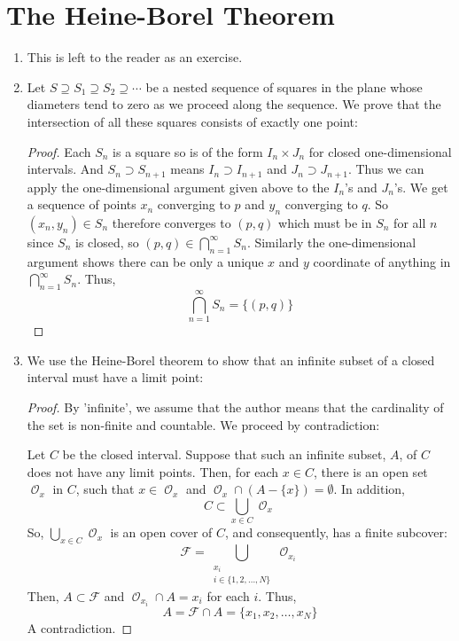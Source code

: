 \documentclass{book}
\DeclareMathOperator*{\Ocal}{\mathcal{O}}
\begin{document}
\section{The Heine-Borel Theorem}
\begin{enumerate}[(1)]
    \item This is left to the reader as an exercise.

    \item Let $S\supseteq S_1\supseteq S_2\supseteq \cdots$ be a nested sequence of squares in the plane whose diameters tend to zero as we proceed along the sequence. We prove that the intersection of all these squares consists of exactly one point: 
        \begin{proof} Each $S_n$ is a square so is of the form $I_n\times J_n$ for closed one-dimensional intervals.  And $S_n\supset S_{n+1}$ means $I_n\supset I_{n+1}$ and $J_n\supset J_{n+1}$.  Thus we can apply the one-dimensional argument given above to the $I_n$'s and $J_n$'s.  We get a sequence of points $x_n$ converging to $p$ and $y_n$ converging to $q$. So $(x_n,y_n)\in S_n$ therefore converges to $(p,q)$ which must be in $S_n$ for all $n$ since $S_n$ is closed, so $(p,q)\in\bigcap_{n=1}^\infty S_n$. Similarly the one-dimensional argument shows there can be only a unique $x$ and $y$ coordinate of anything in  $\bigcap_{n=1}^\infty S_n$.  Thus,  
            \[\bigcap_{n=1}^\infty S_n=\{(p,q)\}\]
        \end{proof}

    \item We use the Heine-Borel theorem to show that an infinite subset of a closed interval must have a limit point: 
        \begin{proof} By 'infinite', we assume that the author means that the cardinality of the set is non-finite and countable. We proceed by contradiction: 
            \par Let $C$ be the closed interval. Suppose that such an infinite subset, $A$, of $C$ does not have any limit points. Then, for each $x \in C$, there is an open set ${\Ocal}_x$ in $C$, such that $x \in {\Ocal}_x$ and ${\Ocal}_x \cap (A - \{x\}) = \emptyset$. In addition, 
            \[C \subset \bigcup_{x \in C} {\Ocal}_x \]
            So, $\bigcup_{x \in C} {\Ocal}_x$ is an open cover of $C$, and consequently, has a finite subcover: 
            \[\mathcal{F} = \bigcup_{\substack{x_i  \\ i \in \{1,2, \dots, N\}}} {\Ocal}_{x_i}\]
            Then, $A \subset \mathcal{F}$ and ${\Ocal}_{x_i} \cap A = x_i$ for each $i$. Thus, 
            \[A = \mathcal{F} \cap A = \{x_1, x_2, \dots, x_N\}\]
            A contradiction. 
        \end{proof}


\end{enumerate}
\end{document}
